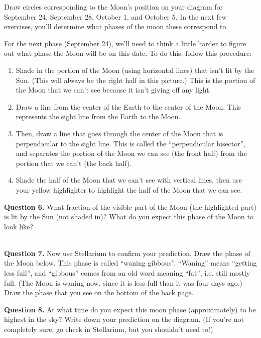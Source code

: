 \documentclass[11pt]{article}
\begin{document}
Draw circles corresponding to the Moon's position on your diagram for September 24, September 28, October 1, and October 5. In the next few exercises, you'll determine what phases of the moon these correspond to.

\newpage

For the next phase (September 24), we'll need to think a little harder to figure out what phase the Moon will be on this date. 
To do this, follow this procedure:

\begin{enumerate}
	\item Shade in the portion of the Moon (using horizontal lines) that isn't lit by the Sun. (This will always be the right half in this picture.) This is the portion of the Moon that we can't see because it isn't giving off any light.
	\item Draw a line from the center of the Earth to the center of the Moon. This represents the sight line from the Earth to the Moon.
	\item Then, draw a line that goes through the center of the Moon that is perpendicular to the sight line. This is called the ``perpendicular bisector'', and separates the portion of the Moon we can see (the front half) from the portion that we can't (the back half).
	\item Shade the half of the Moon that we can't see with vertical lines, then use your yellow highlighter to highlight the half of the Moon that we can see.
\end{enumerate}

\textbf{Question 6.} What fraction of the visible part of the Moon (the highlighted part) is lit by the Sun (not shaded in)? What do you expect this phase of the Moon to look like?


\vspace*{1.5cm}

\hrulefill\\

\textbf{Question 7.} Now use Stellarium to confirm your prediction. Draw the phase of the Moon below. This phase is called ``waning gibbous''. ``Waning'' means ``getting less full'', and ``gibbous'' comes from an old word meaning ``fat'', i.e. still mostly full. (The Moon is waning now, since it is less full than it was four days ago.)
Draw the phase that you see on the bottom of the back page.


\textbf{Question 8.} At what time do you expect this moon phase (approximately) to be highest in the sky? Write down your prediction on the diagram. (If you're not completely sure, go check in Stellarium, but you shouldn't need to!)
\end{document}
